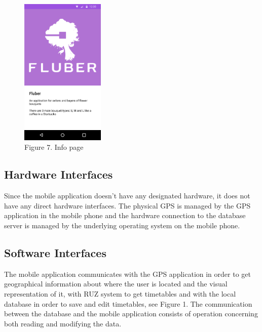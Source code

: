 \documentclass{scrreprt}
\begin{document}
\begin{figure}[h]
\begin{minipage}[h]{0.32\linewidth}
\end{minipage}
\hfill
\begin{minipage}[h]{0.32\linewidth}
\end{minipage}
\begin{minipage}[h]{0.32\linewidth}
\end{minipage}
\end{figure}
\begin{figure}[h]
\center
{\includegraphics[width=40mm]{info.png} \\Figure 7. Info page}
\end{figure}

\newpage
\subsection{Hardware Interfaces}
Since the mobile application doesn't have any designated hardware, it does not have
any direct hardware interfaces. The physical GPS is managed by the GPS application in the mobile phone
and the hardware connection to the database server is managed by the underlying operating system on the
mobile phone.

\subsection{Software Interfaces}
The mobile application communicates with the GPS application in order to get geographical information
about where the user is located and the visual representation of it, with RUZ system to get timetables
and with the local database in order to save and edit timetables, see Figure 1. The communication between
the database and the mobile application consists of operation concerning both reading and modifying the data.
\end{document}
